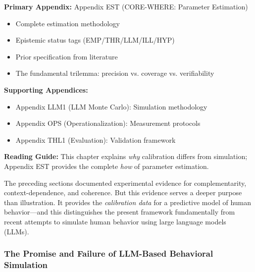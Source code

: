 \begin{tcolorbox}[colback=orange!5!white, colframe=orange!75!black,
    title=\textbf{Appendix References}]

\textbf{Primary Appendix:} Appendix EST (CORE-WHERE: Parameter Estimation)
\begin{itemize}[nosep]
    \item Complete estimation methodology
    \item Epistemic status tags (EMP/THR/LLM/ILL/HYP)
    \item Prior specification from literature
    \item The fundamental trilemma: precision vs. coverage vs. verifiability
\end{itemize}

\textbf{Supporting Appendices:}
\begin{itemize}[nosep]
    \item Appendix LLM1 (LLM Monte Carlo): Simulation methodology
    \item Appendix OPS (Operationalization): Measurement protocols
    \item Appendix THL1 (Evaluation): Validation framework
\end{itemize}

\textbf{Reading Guide:} This chapter explains \textit{why} calibration differs from simulation;
Appendix EST provides the complete \textit{how} of parameter estimation.

\end{tcolorbox}

The preceding sections documented experimental evidence for complementarity,
context-dependence, and coherence. But this evidence serves a deeper purpose
than illustration. It provides the \emph{calibration data} for a predictive
model of human behavior---and this distinguishes the present framework
fundamentally from recent attempts to simulate human behavior using large
language models (LLMs).


\subsubsection{The Promise and Failure of LLM-Based Behavioral Simulation}


